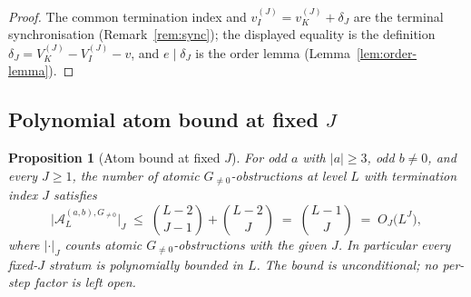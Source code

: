 \documentclass[11pt,reqno]{amsart}
\theoremstyle{plain}
\newtheorem{proposition}[theorem]{Proposition}
\theoremstyle{definition}
\theoremstyle{remark}
\newcommand{\Atom}{\mathcal{A}}
\newcommand{\Vk}{V_{K}}
\newcommand{\Vi}{V_{I}}
\newcommand{\vk}{v_{K}}
\newcommand{\vi}{v_{I}}
\begin{document}
\begin{proof}
The common termination index and $\vi^{(J)} = \vk^{(J)} + \delta_J$ are the
terminal synchronisation (Remark~\ref{rem:sync}); the displayed equality is
the definition $\delta_J = \Vk^{(J)} - \Vi^{(J)} - v$, and $e \mid \delta_J$
is the order lemma (Lemma~\ref{lem:order-lemma}). \qedhere
\end{proof}

\subsection{Polynomial atom bound at fixed \texorpdfstring{$J$}{J}}

\begin{proposition}[Atom bound at fixed $J$]\label{prop:atom-J}
For odd $a$ with $\lvert a \rvert \ge 3$, odd $b \ne 0$, and every
$J \ge 1$, the number of atomic $G_{\ne 0}$-obstructions at level $L$ with
termination index $J$ satisfies
\[
\lvert \Atom_L^{(a,b), G_{\ne 0}} \rvert_J
   \;\le\; \binom{L-2}{J-1} + \binom{L-2}{J}
   \;=\; \binom{L-1}{J}
   \;=\; O_J\!\bigl(L^{J}\bigr),
\]
where $\lvert \cdot \rvert_J$ counts atomic $G_{\ne 0}$-obstructions with
the given $J$. In particular every fixed-$J$ stratum is polynomially
bounded in $L$. The bound is unconditional; no per-step factor is left open.
\end{proposition}
\end{document}
